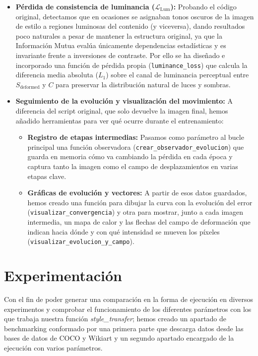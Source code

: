 \documentclass[a4paper]{article}
\begin{document}
\begin{itemize}
    \item \textbf{Pérdida de consistencia de luminancia ($\mathcal{L}_{\text{Lum}}$):} Probando el código original, detectamos que en ocasiones se asignaban tonos oscuros de la imagen de estilo a regiones luminosas del contenido (y viceversa), dando resultados poco naturales a pesar de mantener la estructura original, ya que la Información Mutua evalúa únicamente dependencias estadísticas y es invariante frente a inversiones de contraste. Por ello se ha diseñado e incorporado una función de pérdida propia (\texttt{luminance\_loss}) que calcula la diferencia media absoluta ($L_1$) sobre el canal de luminancia perceptual \cite{itur1995bt601} entre $S_{\text{deformed}}$ y $C$ para preservar la distribución natural de luces y sombras.
    
    \item \textbf{Seguimiento de la evolución y visualización del movimiento:} A diferencia del script original, que solo devuelve la imagen final, hemos añadido herramientas para ver qué ocurre durante el entrenamiento:
    \begin{itemize}
        \item \textbf{Registro de etapas intermedias:} Pasamos como parámetro al bucle principal una función observadora (\texttt{crear\_observador\_evolucion}) que guarda en memoria cómo va cambiando la pérdida en cada época y captura tanto la imagen como el campo de desplazamientos en varias etapas clave.
        \item \textbf{Gráficas de evolución y vectores:} A partir de esos datos guardados, hemos creado una función para dibujar la curva con la evolución del error (\texttt{visualizar\_convergencia}) y otra para mostrar, junto a cada imagen intermedia, un mapa de calor y las flechas del campo de deformación que indican hacia dónde y con qué intensidad se mueven los píxeles (\texttt{visualizar\_evolucion\_y\_campo}).
    \end{itemize}
\end{itemize}

\section{Experimentación}
\noindent Con el fin de poder generar una comparación en la forma de ejecución en diversos experimentos y comprobar el funcionamiento de los diferentes parámetros con los que trabaja nuestra función \textit{style\_transfer}; hemos creado un apartado de benchmarking conformado por una primera parte que descarga datos desde las bases de datos de COCO y Wikiart y un segundo apartado encargado de la ejecución con varios parámetros. 
\end{document}
